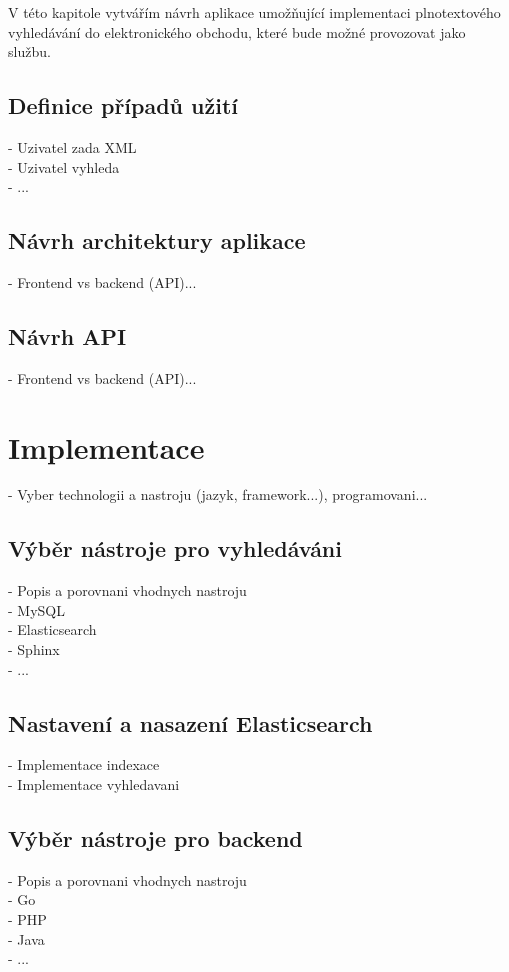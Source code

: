 \documentclass[FM,DP]{tulthesis}
\begin{document}
V této kapitole vytvářím návrh aplikace umožňující implementaci plnotextového vyhledávání
do elektronického obchodu, které bude možné provozovat jako službu. 

\section{Definice případů užití}
- Uzivatel zada XML\\
- Uzivatel vyhleda\\
- ...

\section{Návrh architektury aplikace}
- Frontend vs backend (API)...

\section{Návrh API}
- Frontend vs backend (API)...



\chapter{Implementace}
- Vyber technologii a nastroju (jazyk, framework...), programovani...

\section{Výběr nástroje pro vyhledáváni}
- Popis a porovnani vhodnych nastroju\\
\hspace*{5mm}- MySQL\\
\hspace*{5mm}- Elasticsearch\\
\hspace*{5mm}- Sphinx\\
\hspace*{5mm}- ...

\section{Nastavení a nasazení Elasticsearch}
- Implementace indexace\\
- Implementace vyhledavani

\section{Výběr nástroje pro backend}
- Popis a porovnani vhodnych nastroju\\
\hspace*{5mm}- Go\\
\hspace*{5mm}- PHP\\
\hspace*{5mm}- Java\\
\hspace*{5mm}- ...
\end{document}
